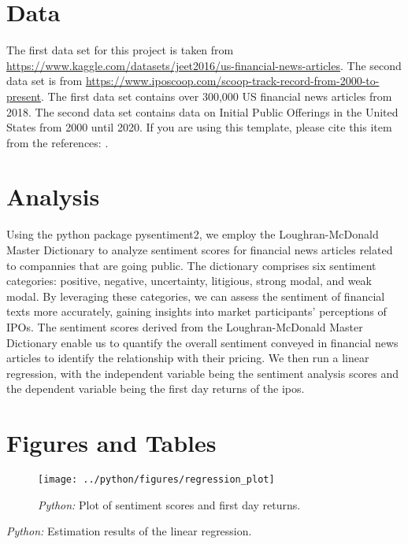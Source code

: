 \documentclass[11pt, a4paper, leqno]{article}
\begin{document}
\section{Data} %
\label{sec:Data}
The first data set for this project is taken from
\url{https://www.kaggle.com/datasets/jeet2016/us-financial-news-articles}.
The second data set is from
\url{https://www.iposcoop.com/scoop-track-record-from-2000-to-present}.
The first data set contains over 300,000 US financial news articles from 2018.
The second data set contains data on Initial Public Offerings in the United States from 2000 until 2020.
If you are using this template, please cite this item from the references:
\citet{GaudeckerEconProjectTemplates}.

\section{Analysis} %
\label{sec:Analysis}
Using the python package pysentiment2, we employ the Loughran-McDonald Master Dictionary to analyze sentiment scores
for financial news articles related to compannies that are going public. The dictionary comprises six sentiment categories:
positive, negative, uncertainty, litigious, strong modal, and weak modal. By leveraging these categories,
we can assess the sentiment of financial texts more accurately, gaining insights into market participants' perceptions of IPOs.
The sentiment scores derived from the Loughran-McDonald Master Dictionary enable us to quantify the overall sentiment conveyed
in financial news articles to identify the relationship with their pricing.
    We then run a linear regression, with the independent variable being the sentiment analysis scores and the dependent variable being the first day returns of the ipos.

\section{Figures and Tables}
\label{sec:Figures and Tables}

\begin{figure}[H]

    \centering
    \texttt{[image: ../python/figures/regression\_plot]}

    \caption{\emph{Python:} Plot of sentiment scores and first day returns.}
    \label{fig:python-predictions}

\end{figure}

\begin{table}[H]
    
    \caption{\label{tab:python-summary}\emph{Python:} Estimation results of the
        linear regression.}
\end{table}






\printbibliography
{}



\end{document}
